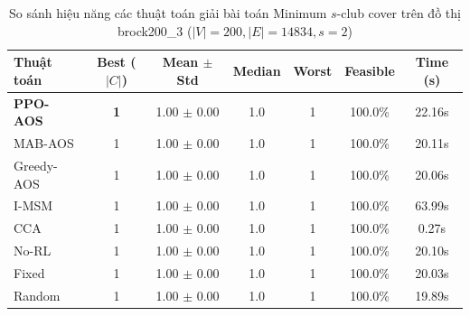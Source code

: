 \begin{table}[htbp]
\centering
\caption{So sánh hiệu năng các thuật toán giải bài toán Minimum $s$-club cover trên đồ thị brock200_3 ($|V|=200, |E|=14834, s=2$)}
\label{tab:results_brock200_3}
\begin{tabular}{lcccccc}
\hline
\textbf{Thuật toán} & \textbf{Best ($|C|$)} & \textbf{Mean $\pm$ Std} & \textbf{Median} & \textbf{Worst} & \textbf{Feasible} & \textbf{Time (s)} \\
\hline
\textbf{PPO-AOS} & \textbf{1} & 1.00 $\pm$ 0.00 & 1.0 & 1 & 100.0\% & 22.16s \\
MAB-AOS & 1 & 1.00 $\pm$ 0.00 & 1.0 & 1 & 100.0\% & 20.11s \\
Greedy-AOS & 1 & 1.00 $\pm$ 0.00 & 1.0 & 1 & 100.0\% & 20.06s \\
I-MSM & 1 & 1.00 $\pm$ 0.00 & 1.0 & 1 & 100.0\% & 63.99s \\
CCA & 1 & 1.00 $\pm$ 0.00 & 1.0 & 1 & 100.0\% & 0.27s \\
No-RL & 1 & 1.00 $\pm$ 0.00 & 1.0 & 1 & 100.0\% & 20.10s \\
Fixed & 1 & 1.00 $\pm$ 0.00 & 1.0 & 1 & 100.0\% & 20.03s \\
Random & 1 & 1.00 $\pm$ 0.00 & 1.0 & 1 & 100.0\% & 19.89s \\
\hline
\end{tabular}
\end{table}
